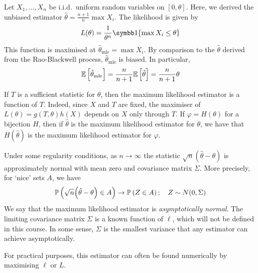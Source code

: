 \begin{example}
	Let \( X_1, \dots, X_n \) be i.i.d.\ uniform random variables on \( [0,\theta] \).
	Here, we derived the unbiased estimator \( \hat \theta = \frac{n+1}{n} \max X_i \).
	The likelihood is given by
	\[
		L(\theta) = \frac{1}{\theta^n} \symbb 1\qty{\max X_i \leq \theta}
	\]
	This function is maximised at \( \hat \theta_{\mathrm{mle}} = \max X_i \).
	By comparison to the \( \hat \theta \) derived from the Rao-Blackwell process, \( \hat \theta_{\mathrm{mle}} \) is biased.
	In particular,
	\[
		\mathbb{E}\left[{\hat \theta_{\mathrm{mle}}}\right] = \frac{n}{n+1} \mathbb{E}\left[{\hat \theta}\right] = \frac{n}{n+1} \theta
	\]
\end{example}
\begin{remark}
	If \( T \) is a sufficient statistic for \( \theta \), then the maximum likelihood estimator is a function of \( T \).
	Indeed, since \( X \) and \( T \) are fixed, the maximiser of \( L(\theta) = g(T,\theta) h(X) \) depends on \( X \) only through \( T \).
	If \( \varphi = H(\theta) \) for a bijection \( H \), then if \( \hat \theta \) is the maximum likelihood estimator for \( \theta \), we have that \( H(\hat \theta) \) is the maximum likelihood estimator for \( \varphi \).

	Under some regularity conditions, as \( n \to \infty \) the statistic \( \sqrt{n} (\hat \theta - \theta) \) is approximately normal with mean zero and covariance matrix \( \Sigma \).
	More precisely, for `nice' sets \( A \), we have
	\[
		\mathbb{P}\left({\sqrt{n} \qty(\hat \theta - \theta) \in A}\right) \to \mathbb{P}\left({Z \in A}\right);\quad Z \sim N(0, \Sigma)
	\]
	We say that the maximum likelihood estimator is \textit{asymptotically normal}.
	The limiting covariance matrix \( \Sigma \) is a known function of \( \ell \), which will not be defined in this course.
	In some sense, \( \Sigma \) is the smallest variance that any estimator can achieve asymptotically.

	For practical purposes, this estimator can often be found numerically by maximising \( \ell \) or \( L \).
\end{remark}
